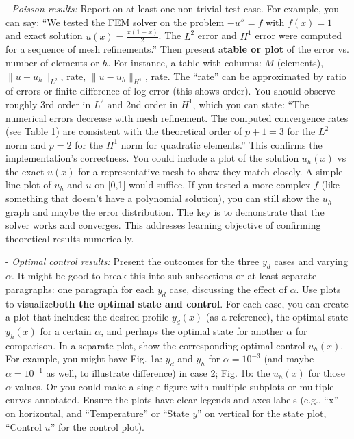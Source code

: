 \documentclass[a4paper,10pt]{report}
\begin{document}
- \emph{Poisson results:} Report on at least one non-trivial test case. For example, you can say: “We tested the FEM solver on the problem \(-u''=f\) with \(f(x)=1\) and exact solution \(u(x)=\frac{x(1-x)}{2}\). The \(L^2\) error and \(H^1\) error were computed for a sequence of mesh refinements.” Then present a\textbf{table or plot} of the error vs. number of elements or \(h\). For instance, a table with columns: \(M\) (elements), \(\|u-u_h\|_{L^2}\), rate, \(\|u-u_h\|_{H^1}\), rate. The “rate” can be approximated by ratio of errors or finite difference of log error (this shows order). You should observe roughly 3rd order in \(L^2\) and 2nd order in \(H^1\), which you can state: “The numerical errors decrease with mesh refinement. The computed convergence rates (see Table 1) are consistent with the theoretical order of \(p+1=3\) for the \(L^2\) norm and \(p=2\) for the \(H^1\) norm for quadratic elements.” This confirms the implementation's correctness. You could include a plot of the solution \(u_h(x)\) vs the exact \(u(x)\) for a representative mesh to show they match closely. A simple line plot of \(u_h\) and \(u\) on [0,1] would suffice. If you tested a more complex \(f\) (like something that doesn't have a polynomial solution), you can still show the \(u_h\) graph and maybe the error distribution. The key is to demonstrate that the solver works and converges. This addresses learning objective of confirming theoretical results numerically.

- \emph{Optimal control results:} Present the outcomes for the three \(y_d\) cases and varying \(\alpha\). It might be good to break this into sub-subsections or at least separate paragraphs: one paragraph for each \(y_d\) case, discussing the effect of \(\alpha\). Use plots to visualize\textbf{both the optimal state and control}. For each case, you can create a plot that includes: the desired profile \(y_d(x)\) (as a reference), the optimal state \(y_h(x)\) for a certain \(\alpha\), and perhaps the optimal state for another \(\alpha\) for comparison. In a separate plot, show the corresponding optimal control \(u_h(x)\). For example, you might have Fig. 1a: \(y_d\) and \(y_h\) for \(\alpha=10^{-3}\) (and maybe \(\alpha=10^{-1}\) as well, to illustrate difference) in case 2; Fig. 1b: the \(u_h(x)\) for those \(\alpha\) values. Or you could make a single figure with multiple subplots or multiple curves annotated. Ensure the plots have clear legends and axes labels (e.g., “x” on horizontal, and “Temperature” or “State \(y\)” on vertical for the state plot, “Control \(u\)” for the control plot).
\end{document}
